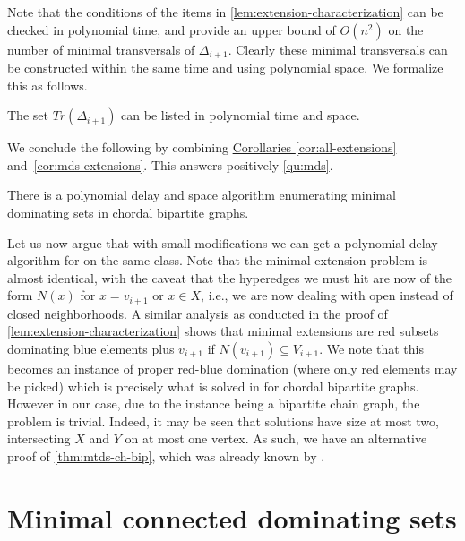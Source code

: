 Note that the conditions of the items in \autoref{lem:extension-characterization} can be checked in polynomial time, and provide an upper bound of $O(n^2)$ on the number of minimal transversals of $\Delta_{i+1}$.
Clearly these minimal transversals can be constructed within the same time and using polynomial space.
We formalize this as follows.

\begin{corollary}\label{cor:mds-extensions}
    The set $Tr(\Delta_{i+1})$ can be listed in polynomial time and space.
\end{corollary}

We conclude the following by combining 
\hyperref[cor:all-extensions]{Corollaries \ref*{cor:all-extensions}} and~\ref{cor:mds-extensions}.
This answers positively \autoref{qu:mds}.

\begin{theorem}\label{thm:mds-ch-bip}
    There is a polynomial delay and space algorithm enumerating minimal dominating sets in chordal bipartite graphs.
\end{theorem}

Let us now argue that with small modifications we can get a polynomial-delay algorithm for \tdomenum{} on the same class.
Note that the minimal extension problem is almost identical, with the caveat that the hyperedges we must hit are now of the form $N(x)$ for $x=v_{i+1}$ or $x\in X$, i.e., we are now dealing with open instead of closed neighborhoods.
A similar analysis as conducted in the proof of \autoref{lem:extension-characterization} shows that minimal extensions are red subsets dominating blue elements plus $v_{i+1}$ if $N(v_{i+1})\subseteq V_{i+1}$.
We note that this becomes an instance of proper red-blue domination (where only red elements may be picked) which is precisely what is solved in \cite{golovach2016enumerating} for chordal bipartite graphs.
However in our case, due to the instance being a bipartite chain graph, the problem is trivial.
Indeed, it may be seen that solutions have size at most two, intersecting $X$ and $Y$ on at most one vertex.
As such, we have an alternative proof of \autoref{thm:mtds-ch-bip}, which was already known by \cite{golovach2016enumerating}.

\thmtds*

\section{Minimal connected dominating sets}\label{sec:mcds}

